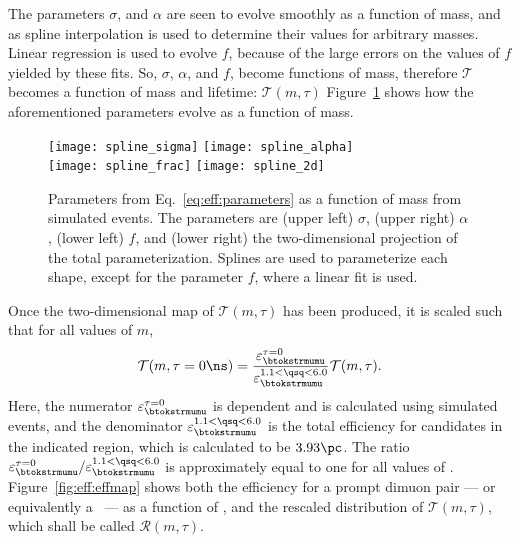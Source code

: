 The parameters $\sigma$, and $\alpha$ are seen to evolve smoothly as a function of mass, and as
spline interpolation is used to determine their values for arbitrary masses.
Linear regression is used to evolve $f$, because of the large errors on the values of $f$ yielded
by these fits.
So, $\sigma$, $\alpha$, and $f$, become functions of mass, therefore $\mathcal{T}$ becomes a
function of mass and lifetime: $\mathcal{T}(m,\tau)$
Figure~\ref{fig:eff:spline} shows how the aforementioned parameters evolve as a function of mass.

\begin{figure}
  \begin{center}
    \texttt{[image: spline\_sigma]}
    \texttt{[image: spline\_alpha]}\\
    \texttt{[image: spline\_frac]}
    \texttt{[image: spline\_2d]}
    \caption[Parameterization of lifetime as a function of mass]
    {
      Parameters from Eq.~\protect\ref{eq:eff:parameters} as a function of mass from
      simulated events.
      The parameters are
      (upper left) $\sigma$,
      (upper right) $\alpha$,
      (lower left) $f$, and
      (lower right) the two-dimensional projection of the total parameterization.
      Splines are used to parameterize each shape, except for the parameter $f$, where a
      linear fit is used.
    }
    \label{fig:eff:spline}
  \end{center}
\end{figure}


Once the two-dimensional map of $\mathcal{T}(m,\tau)$ has been produced, it is scaled such that
for all values of $m$,
\begin{equation}
  \mathcal{T}(m,\tau=0\ns) =
  \frac{
    \varepsilon_{\btokstrmumu}^{\tau=0}
  }{
    \varepsilon_{\btokstrmumu}^{1.1<\qsq<6.0}
  }
  \mathcal{T}(m,\tau).
\end{equation}
Here, the numerator $\varepsilon_{\btokstrmumu}^{\tau=0}$ is \qsq dependent and is calculated using
simulated events, and the denominator $\varepsilon_{\btokstrmumu}^{1.1<\qsq<6.0}$ is the total
efficiency for candidates in the indicated \qsq region, which is calculated to be $3.93\pc$.
The ratio
$\varepsilon_{\btokstrmumu}^{\tau=0} / \varepsilon_{\btokstrmumu}^{1.1<\qsq<6.0}$ is approximately
equal to one for all values of \mass{\db}.
Figure~\ref{fig:eff:effmap} shows both the efficiency for a prompt dimuon pair --- or equivalently
a \db\ --- as a function of \qsq, and the rescaled distribution of $\mathcal{T}(m,\tau)$, which
shall
be called $\mathcal{R}(m,\tau)$.

